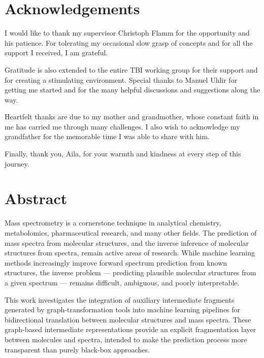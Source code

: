 \chapter*{Acknowledgements}
\renewcommand{\baselinestretch}{\linespacing}
\small\normalsize

I would like to thank my supervisor Christoph Flamm for the opportunity and his patience.
For tolerating my occasional slow grasp of concepts and for all the support I received, I am grateful.

Gratitude is also extended to the entire TBI working group for their support and for creating a stimulating environment. Special thanks to Manuel Uhlir for getting me started and for the many helpful discussions and suggestions along the way.

Heartfelt thanks are due to my mother and grandmother, whose constant faith in me has carried me through many challenges. I also wish to acknowledge my grandfather for the memorable time I was able to share with him.

Finally, thank you, Aila, for your warmth and kindness at every step of this journey.

\newpage
{}
\renewcommand{\baselinestretch}{1.3}\normalsize
\tableofcontents
\renewcommand{\baselinestretch}{1.5}\normalsize
\clearpage
\chapter*{Abstract}

Mass spectrometry is a cornerstone technique in analytical chemistry, metabolomics, pharmaceutical research, and many other fields. The prediction of mass spectra from molecular structures, and the inverse inference of molecular structures from spectra, remain active areas of research.
While machine learning methods increasingly improve forward spectrum prediction from known structures, the inverse problem --- predicting plausible molecular structures from a given spectrum --- remains difficult, ambiguous, and poorly interpretable.

This work investigates the integration of auxiliary intermediate fragments generated by graph-transformation tools into machine learning pipelines for bidirectional translation between molecular structures and mass spectra.
These graph-based intermediate representations provide an explicit fragmentation layer between molecules and spectra, intended to make the prediction process more transparent than purely black-box approaches.

